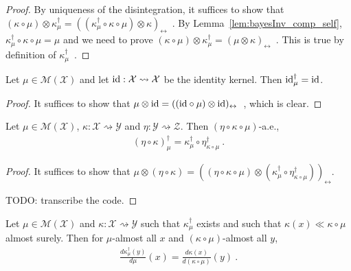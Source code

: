 \begin{proof}\mathlibok
{}
By uniqueness of the disintegration, it suffices to show that $(\kappa \circ \mu) \otimes \kappa_\mu^\dagger = ((\kappa_\mu^\dagger \circ \kappa \circ \mu) \otimes \kappa)_\leftrightarrow$~.
By Lemma~\ref{lem:bayesInv_comp_self}, $\kappa_\mu^\dagger \circ \kappa \circ \mu = \mu$ and we need to prove $(\kappa \circ \mu) \otimes \kappa_\mu^\dagger = (\mu \otimes \kappa)_\leftrightarrow$~.
This is true by definition of $\kappa_\mu^\dagger$~.
\end{proof}


\begin{lemma}
  \label{lem:bayesInv_id}
  \mathlibok
  Let $\mu \in \mathcal M (\mathcal X)$ and let $\textup{id} : \mathcal X \rightsquigarrow \mathcal X$ be the identity kernel. Then $\textup{id}_\mu^\dagger = \textup{id}$.
\end{lemma}

\begin{proof}\mathlibok
{}
It suffices to show that $\mu \otimes \textup{id} = ((\textup{id} \circ \mu) \otimes \textup{id})_\leftrightarrow$~, which is clear.
\end{proof}


\begin{lemma}
  \label{lem:bayesInv_comp}
  \mathlibok
  Let $\mu \in \mathcal M(\mathcal X)$, $\kappa : \mathcal X \rightsquigarrow \mathcal Y$ and $\eta : \mathcal Y \rightsquigarrow \mathcal Z$. Then $(\eta \circ \kappa \circ \mu)$-a.e.,
  \begin{align*}
  (\eta \circ \kappa)_\mu^\dagger = \kappa_{\mu}^\dagger \circ \eta_{\kappa \circ \mu}^\dagger
  \: .
  \end{align*}
\end{lemma}

\begin{proof}\mathlibok
{}
It suffices to show that $\mu \otimes (\eta \circ \kappa) = ((\eta \circ \kappa \circ \mu) \otimes (\kappa_{\mu}^\dagger \circ \eta_{\kappa \circ \mu}^\dagger))_\leftrightarrow$.

TODO: transcribe the code.
\end{proof}


\begin{lemma}
  \label{lem:rnDeriv_bayesInv}
  \mathlibok
  Let $\mu \in \mathcal M(\mathcal X)$ and $\kappa : \mathcal X \rightsquigarrow \mathcal Y$ such that $\kappa_\mu^\dagger$ exists and such that $\kappa(x) \ll \kappa \circ \mu$ almost surely.
  Then for $\mu$-almost all $x$ and $(\kappa \circ \mu)$-almost all $y$,
  \begin{align*}
  \frac{d \kappa_\mu^\dagger(y)}{d \mu}(x) = \frac{d \kappa(x)}{d(\kappa \circ \mu)}(y)
  \: .
  \end{align*}
\end{lemma}

